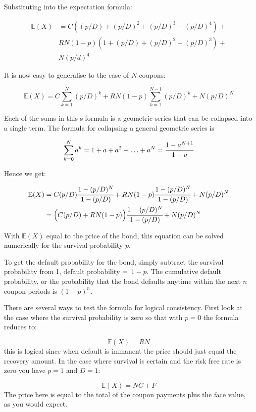 Substituting into the expectation formula:

\begin{align*}
\mathbb{E}(X) &= C((p/D) + (p/D)^2 + (p/D)^3 + (p/D)^4) + \\
&RN(1-p)(1+(p/D)+(p/D)^2 + (p/D)^3) + \\
&N(p/d)^4 
\end{align*}

It is now easy to generalise to the case of $N$ coupons:

\[ \mathbb{E}(X) = C \sum_{k=1}^{N}{(p/D)^k} + RN(1-p)\sum_{k=1}^{N-1}{(p/D)^k} + N(p/D)^N \]

Each of the sums in this s formula is a geometric series that can be collapsed
into a single term. The formula for collapsing a general geometric series is 

\[ \sum_{k=0}^N a^k = 1 + a + a^2 + \ldots + a^N = \cfrac{1-a^{N+1}}{1-a} \]

Hence we get:

\begin{align*}
\mathbb{E}(X) &= C(p/D) \cfrac{1-(p/D)^N}{1-(p/D)}+RN(1-p)\cfrac{1-(p/D)^N}{1-(p/D)} + N(p/D)^N \\
&= \Big(C(p/D) + RN(1-p)\Big)\cfrac{1-(p/D)^N}{1-(p/D)} + N(p/D)^N 
\end{align*}

With $\mathbb{E}(X)$ equal to the price of the bond, this equation can be solved numerically for the 
survival probability $p$.

To get the default probability for the bond, simply subtract the survival
probability from 1, default probability =~$1 - p$. The cumulative default
probability, or the probability that the bond defaults anytime within the
next $n$ coupon periods is $(1 - p)^n$.

There are several ways to test the formula for logical consistency. First look
at the case where the survival probability is zero so that with $p = 0$ the
formula reduces to:

\[\mathbb{E}(X) = RN\]
this is logical since when default is immanent the price should just equal the
recovery amount.
In the case where survival is certain and the risk free rate is zero you have
$p = 1$ and $D=1$:

\[\mathbb{E}(X) = NC + F \]
The price here is equal to the total of the coupon payments plus the face
value, as you would expect.
